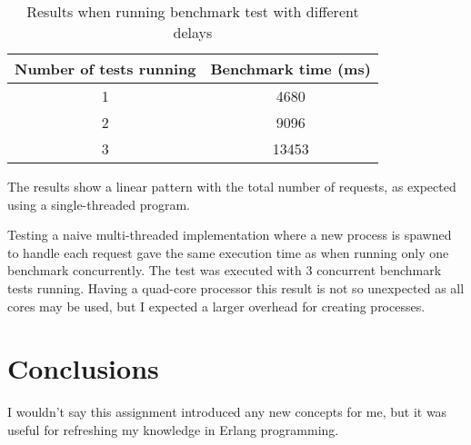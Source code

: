 \documentclass[a4paper, 11pt]{article}
\begin{document}
\begin{table}[h]
\centering
\begin{tabular}{cc}
Number of tests running & Benchmark time (ms)\\\hline
1 & 4680\\\hline
2 & 9096\\\hline
3 & 13453\\\hline
\end{tabular}
\caption{Results when running benchmark test with different delays}
\label{tab:results}
\end{table}

The results show a linear pattern with the total number of requests, as expected using a single-threaded program.

Testing a naive multi-threaded implementation where a new process is spawned to handle each request gave the same execution time as when running only one benchmark concurrently. The test was executed with 3 concurrent benchmark tests running. Having a quad-core processor this result is not so unexpected as all cores may be used, but I expected a larger overhead for creating processes.

\section{Conclusions}

I wouldn't say this assignment introduced any new concepts for me, but it was useful for refreshing my knowledge in Erlang programming.
\end{document}
